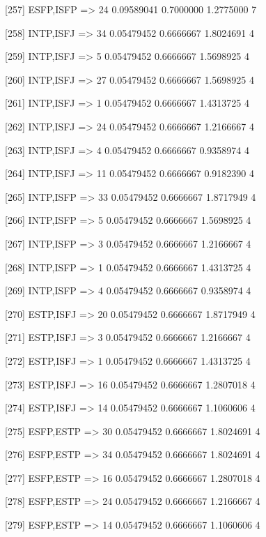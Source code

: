 [257] {ESFP,ISFP}           => {24} 0.09589041 0.7000000  1.2775000  7   

[258] {INTP,ISFJ}           => {34} 0.05479452 0.6666667  1.8024691  4   

[259] {INTP,ISFJ}           => {5}  0.05479452 0.6666667  1.5698925  4   

[260] {INTP,ISFJ}           => {27} 0.05479452 0.6666667  1.5698925  4   

[261] {INTP,ISFJ}           => {1}  0.05479452 0.6666667  1.4313725  4   

[262] {INTP,ISFJ}           => {24} 0.05479452 0.6666667  1.2166667  4   

[263] {INTP,ISFJ}           => {4}  0.05479452 0.6666667  0.9358974  4   

[264] {INTP,ISFJ}           => {11} 0.05479452 0.6666667  0.9182390  4   

[265] {INTP,ISFP}           => {33} 0.05479452 0.6666667  1.8717949  4   

[266] {INTP,ISFP}           => {5}  0.05479452 0.6666667  1.5698925  4   

[267] {INTP,ISFP}           => {3}  0.05479452 0.6666667  1.2166667  4   

[268] {INTP,ISFP}           => {1}  0.05479452 0.6666667  1.4313725  4   

[269] {INTP,ISFP}           => {4}  0.05479452 0.6666667  0.9358974  4   

[270] {ESTP,ISFJ}           => {20} 0.05479452 0.6666667  1.8717949  4   

[271] {ESTP,ISFJ}           => {3}  0.05479452 0.6666667  1.2166667  4   

[272] {ESTP,ISFJ}           => {1}  0.05479452 0.6666667  1.4313725  4   

[273] {ESTP,ISFJ}           => {16} 0.05479452 0.6666667  1.2807018  4   

[274] {ESTP,ISFJ}           => {14} 0.05479452 0.6666667  1.1060606  4   

[275] {ESFP,ESTP}           => {30} 0.05479452 0.6666667  1.8024691  4   

[276] {ESFP,ESTP}           => {34} 0.05479452 0.6666667  1.8024691  4   

[277] {ESFP,ESTP}           => {16} 0.05479452 0.6666667  1.2807018  4   

[278] {ESFP,ESTP}           => {24} 0.05479452 0.6666667  1.2166667  4   

[279] {ESFP,ESTP}           => {14} 0.05479452 0.6666667  1.1060606  4   

